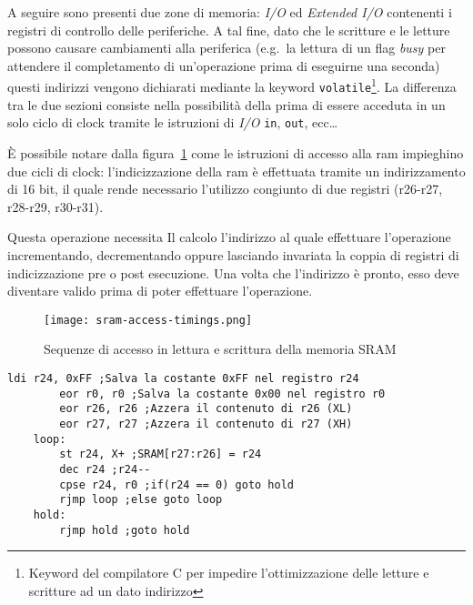 A seguire sono presenti due zone di memoria: \textit{I/O} ed \textit{Extended I/O} contenenti i registri di controllo delle periferiche. A tal fine, dato che le scritture e le letture possono causare cambiamenti alla periferica (e.g.\ la lettura di un flag \textit{busy} per attendere il completamento di un'operazione prima di eseguirne una seconda) questi indirizzi vengono dichiarati mediante la keyword \texttt{volatile}\footnote{Keyword del compilatore C per impedire l'ottimizzazione delle letture e scritture ad un dato indirizzo}. La differenza tra le due sezioni consiste nella possibilità della prima di essere acceduta in un solo ciclo di clock tramite le istruzioni di \textit{I/O} \texttt{in}, \texttt{out}, ecc\ldots

È possibile notare dalla figura~\ref{fig:avr-sram-timings} come le istruzioni di accesso alla ram impieghino due cicli di clock: l'indicizzazione della ram è effettuata tramite un indirizzamento di 16 bit, il quale rende necessario l'utilizzo congiunto di due registri (r26-r27, r28-r29, r30-r31). 

Questa operazione necessita Il calcolo l'indirizzo al quale effettuare l'operazione incrementando, decrementando oppure lasciando invariata la coppia di registri di indicizzazione pre o post esecuzione. Una volta che l'indirizzo è pronto, esso deve diventare valido prima di poter effettuare l'operazione.

\begin{figure}[t]
    \centering
    \texttt{[image: sram-access-timings.png]}
    \caption[Immagine rielaborata a partire dalla fig. 8-4 del documento~\cite{avr:m328p}]{Sequenze di accesso in lettura e scrittura della memoria SRAM\cite[fig 8-4]{avr:m328p}}\label{fig:avr-sram-timings}
\end{figure}



\noindent\begin{minipage}{\textwidth}
    \begin{lstlisting}[language=AVR, caption={Esempio di utilizzo dell'istruzione \texttt{st}}, label=lst:store-example]
        ldi r24, 0xFF ;Salva la costante 0xFF nel registro r24
        eor r0, r0 ;Salva la costante 0x00 nel registro r0
        eor r26, r26 ;Azzera il contenuto di r26 (XL)
        eor r27, r27 ;Azzera il contenuto di r27 (XH)
    loop:
        st r24, X+ ;SRAM[r27:r26] = r24
        dec r24 ;r24--
        cpse r24, r0 ;if(r24 == 0) goto hold
        rjmp loop ;else goto loop
    hold:
        rjmp hold ;goto hold

    \end{lstlisting}
\end{minipage}

